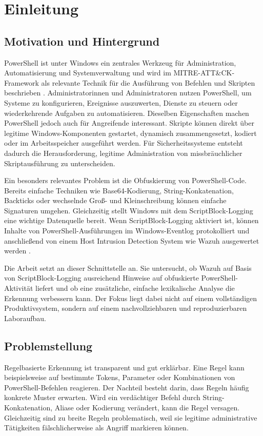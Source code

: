 \documentclass[12pt,a4paper,oneside,parskip=half]{scrreprt}
\begin{document}
\chapter{Einleitung}

\section{Motivation und Hintergrund}
PowerShell ist unter Windows ein zentrales Werkzeug für Administration, Automatisierung und Systemverwaltung und wird im MITRE-ATT\&CK-Framework als relevante Technik für die Ausführung von Befehlen und Skripten beschrieben \cite{mitre-powershell}. Administratorinnen und Administratoren nutzen PowerShell, um Systeme zu konfigurieren, Ereignisse auszuwerten, Dienste zu steuern oder wiederkehrende Aufgaben zu automatisieren. Dieselben Eigenschaften machen PowerShell jedoch auch für Angreifende interessant. Skripte können direkt über legitime Windows-Komponenten gestartet, dynamisch zusammengesetzt, kodiert oder im Arbeitsspeicher ausgeführt werden. Für Sicherheitssysteme entsteht dadurch die Herausforderung, legitime Administration von missbräuchlicher Skriptausführung zu unterscheiden.

Ein besonders relevantes Problem ist die Obfuskierung von PowerShell-Code. Bereits einfache Techniken wie Base64-Kodierung, String-Konkatenation, Backticks oder wechselnde Groß- und Kleinschreibung können einfache Signaturen umgehen. Gleichzeitig stellt Windows mit dem ScriptBlock-Logging eine wichtige Datenquelle bereit. Wenn ScriptBlock-Logging aktiviert ist, können Inhalte von PowerShell-Ausführungen im Windows-Eventlog protokolliert und anschließend von einem Host Intrusion Detection System wie Wazuh ausgewertet werden \cite{elastic-powershell-winlogbeat,splunk-scriptblock}.

Die Arbeit setzt an dieser Schnittstelle an. Sie untersucht, ob Wazuh auf Basis von ScriptBlock-Logging ausreichend Hinweise auf obfuskierte PowerShell-Aktivität liefert und ob eine zusätzliche, einfache lexikalische Analyse die Erkennung verbessern kann. Der Fokus liegt dabei nicht auf einem vollständigen Produktivsystem, sondern auf einem nachvollziehbaren und reproduzierbaren Laboraufbau.

\section{Problemstellung}
Regelbasierte Erkennung ist transparent und gut erklärbar. Eine Regel kann beispielsweise auf bestimmte Tokens, Parameter oder Kombinationen von PowerShell-Befehlen reagieren. Der Nachteil besteht darin, dass Regeln häufig konkrete Muster erwarten. Wird ein verdächtiger Befehl durch String-Konkatenation, Aliase oder Kodierung verändert, kann die Regel versagen. Gleichzeitig sind zu breite Regeln problematisch, weil sie legitime administrative Tätigkeiten fälschlicherweise als Angriff markieren können.
\end{document}
